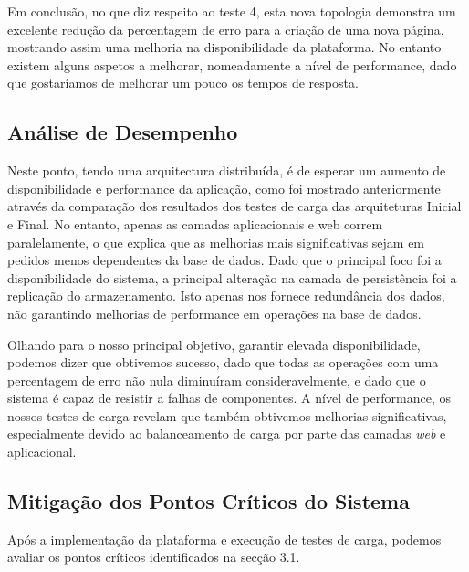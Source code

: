 Em conclusão, no que diz respeito ao teste 4, esta nova topologia demonstra um excelente redução da percentagem de erro para a criação de uma nova página, mostrando assim uma melhoria na disponibilidade da plataforma. No entanto existem alguns aspetos a melhorar, nomeadamente a nível de performance, dado que gostaríamos de melhorar um pouco os tempos de resposta.




\subsection{Análise de Desempenho}


Neste ponto, tendo uma arquitectura distribuída, é de esperar um aumento de disponibilidade e performance da aplicação, como foi mostrado anteriormente através da comparação dos resultados dos testes de carga das arquiteturas Inicial e Final. No entanto, apenas as camadas aplicacionais e web correm paralelamente, o que explica que as melhorias mais significativas sejam em pedidos menos dependentes da base de dados. Dado que o principal foco foi a disponibilidade do sistema, a principal alteração na camada de persistência foi a replicação do armazenamento. Isto apenas nos fornece redundância dos dados, não garantindo melhorias de performance em operações na base de dados. 

Olhando para o nosso principal objetivo, garantir elevada disponibilidade, podemos dizer que obtivemos sucesso, dado que todas as operações com uma percentagem de erro não nula diminuíram consideravelmente, e dado que o sistema é capaz de resistir a falhas de componentes. A nível de performance, os nossos testes de carga revelam que também obtivemos melhorias significativas, especialmente devido ao balanceamento de carga por parte das camadas \textit{web} e aplicacional.

\subsection{Mitigação dos Pontos Críticos do Sistema}

Após a implementação da plataforma e execução de testes de carga, podemos avaliar os pontos críticos identificados na secção 3.1.

